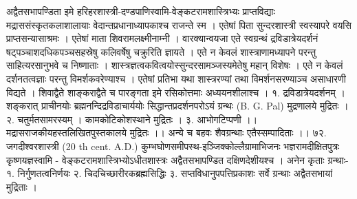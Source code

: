 अद्वैतसभापण्डिता इमे हरिहरशास्त्री-दण्डपाणिस्वामि-वेङ्कटरामशास्त्रिभ्यः प्राप्तविद्याः मद्राससंस्कृतकलाशालायाः वेदान्तप्रधानाध्यापकाश्च राजन्ते स्म । एतेषां पिता सुन्दरशास्त्री स्वस्यापरे वयसि प्राप्तसन्यासाश्रमः । एतेषां माता शिवरामलक्ष्मीनाम्नी । वारक्यान्वयजा एते स्वग्रन्थं द्रविडात्रेयदर्शनं षट्पञ्चाशदधिकपञ्चसहस्रेषु कलिवर्षेषु चक्रुरिति ज्ञायते ।
एते न केवलं शास्त्राणामध्यापने परन्तु साहित्यरसानुभवे च निष्णाताः । शास्त्रज्ञत्वकवित्वयोस्सुन्दरसामञ्जस्यमेतेषु महान् विशेषः । एते न केवलं दर्शनतत्वज्ञाः परन्तु विमर्शकवरेण्याश्च । एतेषां प्रतिभा यथा शास्त्ररण्यां तथा विमर्शनसरण्याञ्च असाधारणी विद्यते । शिवाद्वैते शाङ्कराद्वैते च पारङ्गता इमे रसिकोत्तमाः अध्ययनशीलाश्च ।
१. द्रविडात्रेयदर्शनम् । शङ्करात् प्राचीनयोः ब्रह्मनन्दिद्रविडाचार्ययोः सिद्धान्तप्रदर्शनपरोऽयं ग्रन्थः (B. G. Pal) मुद्रणालये मुद्रितः ।
२. चतुर्मतसामरस्यम् । कामकोटिकोशस्थाने मुद्रितः ।
३. आभोगटिप्पणी ।। मद्रासराजकीयहस्तलिखितपुस्तकालये मुद्रितः ।।
अन्ये च बहवः शैवग्रन्थाः एतैस्सम्पादिताः ।।
७२. जगदीश्वरशास्त्री (20 th cent. A.D.)
कुम्भघोणसमीपस्थ-इञ्जिक्कोल्लैग्रामाभिजनः भज्ञरामदीक्षितपुत्रः कृष्णयज्ञस्वामि - वेङ्कटरामशास्त्रिभ्योऽधीतशास्त्रः अद्वैतसभापण्डित दक्षिणदेशीयश्च । अनेन कृताः ग्रन्थाः- १. निर्गुणतत्वनिर्णयः २. चिदचिच्छारीरकब्रह्मसिद्धिः ३. सप्तविधानुपपत्तिप्रकाशः सर्वे ग्रन्थाः अद्वैतसभायां मुद्रिताः ।
